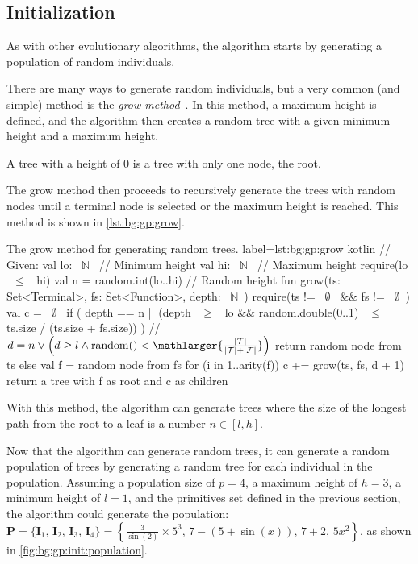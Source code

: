 \subsection{Initialization}
\label{sec:bg:gp:init}
  As with other evolutionary algorithms, the algorithm starts by generating a
  population of random individuals.
  
  There are many ways to generate random individuals, but a very common (and
  simple) method is the \emph{grow 
  method}~\autocite{kozaGeneticProgrammingProgramming1992a}.
  In this method, a maximum height is defined, and the algorithm then creates a
  random tree with a given minimum height and a maximum height.

  \begin{remark}
    A tree with a height of 0 is a tree with only one node, the root.
  \end{remark}

  The grow method then proceeds to recursively generate the trees with random
  nodes until a terminal node is selected or the maximum height is reached.
  This method is shown in \vref{lst:bg:gp:grow}.

  \begin{code}{
    The grow method for generating random trees.
  }{
    label=lst:bg:gp:grow
  }{kotlin}
    // Given:
    val lo: ~$\mathbb{N}$~ // Minimum height
    val hi: ~$\mathbb{N}$~ // Maximum height
    require(lo ~$\leq$~ hi)
    val n = random.int(lo..hi) // Random height
    fun grow(ts: Set<Terminal>, fs: Set<Function>, depth: ~$\mathbb{N}$~) {
      require(ts != ~$\emptyset$~ && fs != ~$\emptyset$~)
      val c = ~$\emptyset$~
      if (
        depth == n || (depth ~$\geq$~ lo && random.double(0..1) ~$\leq$~ ts.size / (ts.size + fs.size))
      ) {
      // $d = n \lor \left(d \geq l \land \mathrm{random}() < \mathlarger{\frac{|\mathcal{T}|}{|\mathcal{T}| + |\mathcal{F}|}}\right)$
        return random node from ts
      } else {
        val f = random node from fs
        for (i in 1..arity(f)) {
          c += grow(ts, fs, d + 1)
        }
        return a tree with f as root and c as children
      }
    }
  \end{code}

  With this method, the algorithm can generate trees where the size of the 
  longest path from the root to a leaf is a number \(n \in [l, h]\).

  Now that the algorithm can generate random trees, it can generate a random
  population of trees by generating a random tree for each individual in the
  population.
  Assuming a population size of \(p = 4\), a maximum height of \(h = 3\), a
  minimum height of \(l = 1\), and the primitives set defined in the previous
  section, the algorithm could generate the population: 
  \(
    \mathbf{P} = \{\mathbf{I}_1,\,\mathbf{I}_2,\,\mathbf{I}_3,\,\mathbf{I}_4\} 
      = \left\{
        \frac{3}{\sin(2)} \times 5^3,\,
        7 - (5 + \sin(x)),\,
        7 + 2,\,
        5x^2
      \right\}
  \), as shown in \vref{fig:bg:gp:init:population}.

